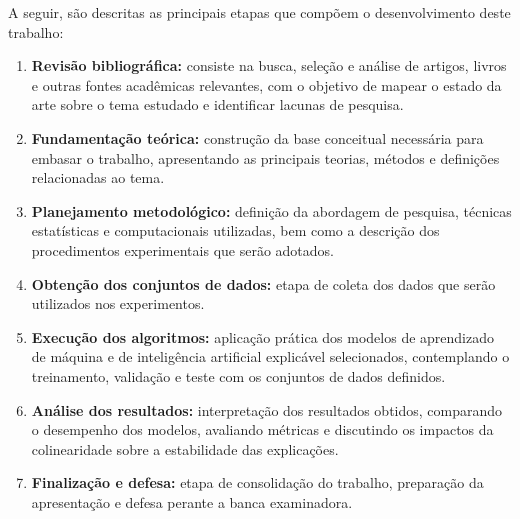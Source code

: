 A seguir, são descritas as principais etapas que compõem o desenvolvimento deste trabalho:
\begin{sloppypar}
\begin{enumerate}
	\item \textbf{Revisão bibliográfica:} consiste na busca, seleção e análise de artigos, livros e outras fontes acadêmicas relevantes, com o objetivo de mapear o estado da arte sobre o tema estudado e identificar lacunas de pesquisa.
	
	\item \textbf{Fundamentação teórica:} construção da base conceitual necessária para embasar o trabalho, apresentando as principais teorias, métodos e definições relacionadas ao tema.

	
	\item \textbf{Planejamento metodológico:} definição da abordagem de pesquisa, técnicas estatísticas e computacionais utilizadas, bem como a descrição dos procedimentos experimentais que serão adotados.
	
	\item \textbf{Obtenção dos conjuntos de dados:} etapa de coleta dos dados que serão utilizados nos experimentos.
	
	\item \textbf{Execução dos algoritmos:} aplicação prática dos modelos de aprendizado de máquina e de inteligência artificial explicável selecionados, contemplando o treinamento, validação e teste com os conjuntos de dados definidos.
	
	\item \textbf{Análise dos resultados:} interpretação dos resultados obtidos, comparando o desempenho dos modelos, avaliando métricas e discutindo os impactos da colinearidade sobre a estabilidade das explicações.
	
	\item \textbf{Finalização e defesa:} etapa de consolidação do trabalho, preparação da apresentação e defesa perante a banca examinadora.
\end{enumerate}
\end{sloppypar}


